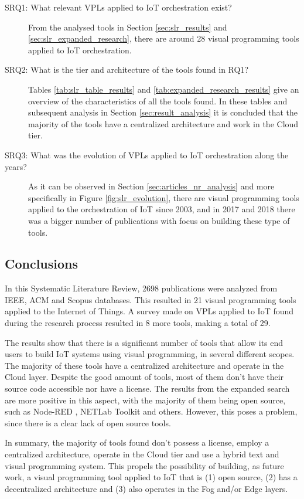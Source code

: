 \begin{description}
    \item [SRQ1: What relevant VPLs applied to IoT orchestration exist?] From the analysed tools in Section \ref{sec:slr_results} and \ref{sec:slr_expanded_research}, there are around 28 visual programming tools applied to IoT orchestration. 
    \item [SRQ2: What is the tier and architecture of the tools found in RQ1?] Tables \ref{tab:slr_table_results} and \ref{tab:expanded_research_results} give an overview of the characteristics of all the tools found. In these tables and subsequent analysis in Section \ref{sec:result_analysis} it is concluded that the majority of the tools have a centralized architecture and work in the Cloud tier.
    \item [SRQ3: What was the evolution of VPLs applied to IoT orchestration along the years?] As it can be observed in Section \ref{sec:articles_nr_analysis} and more specifically in Figure \ref{fig:slr_evolution}, there are visual programming tools applied to the orchestration of IoT since 2003, and in 2017 and 2018 there was a bigger number of publications with focus on building these type of tools.  
\end{description}


\subsection{Conclusions}\label{sec:slr_conclusions}

In this Systematic Literature Review, 2698 publications were analyzed from IEEE, ACM and Scopus databases. This resulted in 21 visual programming tools applied to the Internet of Things. A survey made on VPLs applied to IoT found during the research process resulted in 8 more tools, making a total of 29.
\par The results show that there is a significant number of tools that allow its end users to build IoT systems using visual programming, in several different scopes. The majority of these tools have a centralized architecture and operate in the Cloud layer. Despite the good amount of tools, most of them don't have their source code accessible nor have a license. The results from the expanded search are more positive in this aspect, with the majority of them being open source, such as Node-RED \cite{node_red}, NETLab Toolkit \cite{netlabtoolkit} and others. However, this poses a problem, since there is a clear lack of open source tools.
\par In summary, the majority of tools found don't possess a license, employ a centralized architecture, operate in the Cloud tier and use a hybrid text and visual programming system. This propels the possibility of building, as future work, a visual programming tool applied to IoT that is (1) open source, (2) has a decentralized architecture and (3) also operates in the Fog and/or Edge layers.

